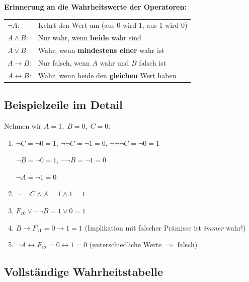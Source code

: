\documentclass[a4paper,12pt]{article}
\begin{document}
\begin{merkbox}
\textbf{Erinnerung an die Wahrheitswerte der Operatoren:}

\smallskip
\begin{tabular}{ll}
$\neg A$: & Kehrt den Wert um (aus 0 wird 1, aus 1 wird 0) \\
$A \wedge B$: & Nur wahr, wenn \textbf{beide} wahr sind \\
$A \vee B$: & Wahr, wenn \textbf{mindestens einer} wahr ist \\
$A \to B$: & Nur falsch, wenn $A$ wahr und $B$ falsch ist \\
$A \leftrightarrow B$: & Wahr, wenn beide den \textbf{gleichen} Wert haben \\
\end{tabular}
\end{merkbox}

\subsection{Beispielzeile im Detail}

Nehmen wir $A=1,\; B=0,\; C=0$:

\begin{enumerate}[leftmargin=2cm]
\item[\textbf{Neg.:}]
$\neg C = \neg 0 = 1$, \quad
$\neg\neg C = \neg 1 = 0$, \quad
$\neg\neg\neg C = \neg 0 = 1$

$\neg B = \neg 0 = 1$, \quad
$\neg\neg B = \neg 1 = 0$

$\neg A = \neg 1 = 0$

\item[$F_{10}$:]
$\neg\neg\neg C \wedge A = 1 \wedge 1 = 1$

\item[$F_{11}$:]
$F_{10} \vee \neg\neg B = 1 \vee 0 = 1$

\item[$F_{12}$:]
$B \to F_{11} = 0 \to 1 = 1$
\quad (Implikation mit falscher Pr\"amisse ist \emph{immer} wahr!)

\item[$F_{13}$:]
$\neg A \leftrightarrow F_{12} = 0 \leftrightarrow 1 = 0$
\quad (unterschiedliche Werte $\Rightarrow$ falsch)
\end{enumerate}

\subsection{Vollst\"andige Wahrheitstabelle}
\end{document}

